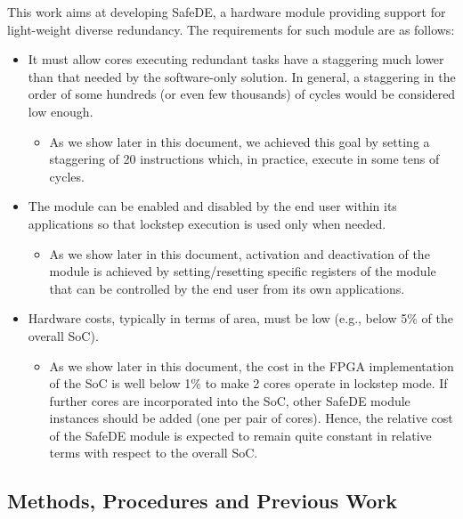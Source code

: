 This work aims at developing SafeDE, a hardware module providing support for light-weight diverse redundancy. The requirements for such module are as follows:
\begin{itemize}
\item It must allow cores executing redundant tasks have a staggering much lower than that needed by the software-only solution. In general, a staggering in the order of some hundreds (or even few thousands) of cycles would be considered low enough. 
\begin{itemize}
\item As we show later in this document, we achieved this goal by setting a staggering of 20 instructions which, in practice, execute in some tens of cycles.
\end{itemize}
\item The module can be enabled and disabled by the end user within its applications so that lockstep execution is used only when needed. 
\begin{itemize}
\item As we show later in this document, activation and deactivation of the module is achieved by setting/resetting specific registers of the module that can be controlled by the end user from its own applications.
\end{itemize}
\item Hardware costs, typically in terms of area, must be low (e.g., below 5\% of the overall SoC).
\begin{itemize}
\item As we show later in this document, the cost in the FPGA implementation of the SoC is well below 1\% to make 2 cores operate in lockstep mode. If further cores are incorporated into the SoC, other SafeDE module instances should be added (one per pair of cores). Hence, the relative cost of the SafeDE module is expected to remain quite constant in relative terms with respect to the overall SoC.
\end{itemize}
\end{itemize}


\subsection{Methods, Procedures and Previous Work}

